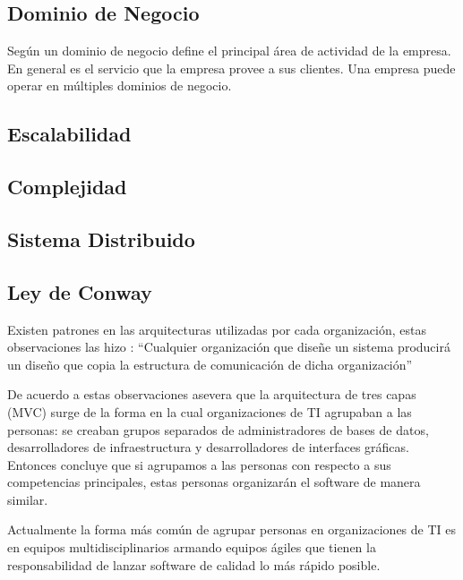 \subsection{Dominio de Negocio}
Según \cite{khononov2021learning} un dominio de negocio define el principal área de actividad de
la empresa. En general es el servicio que la empresa provee a sus clientes.
Una empresa puede operar en múltiples dominios de negocio.



\subsection{Escalabilidad}

\subsection{Complejidad}

\subsection{Sistema Distribuido}

\subsection{Ley de Conway}
Existen patrones en las arquitecturas utilizadas por cada organización, estas observaciones
las hizo \cite{conway1968committees}: ``Cualquier organización que diseñe un sistema producirá
un diseño que copia la estructura de comunicación de dicha organización''


De acuerdo a estas observaciones \cite{newman2019monolith} asevera que la arquitectura de tres capas
(MVC) surge de la forma en la cual organizaciones de TI agrupaban a las personas: se creaban grupos
separados de administradores de bases de datos, desarrolladores de infraestructura y desarrolladores
de interfaces gráficas. Entonces concluye que si agrupamos a las personas con respecto a sus competencias
principales, estas personas organizarán el software de manera similar.

Actualmente la forma más común de agrupar personas en organizaciones de TI es en equipos multidisciplinarios
armando equipos ágiles que tienen la responsabilidad de lanzar software de calidad lo más rápido posible.

